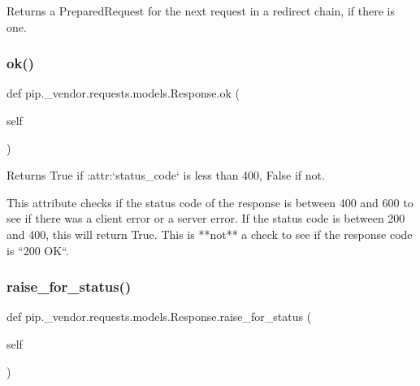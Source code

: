 \begin{DoxyVerb}Returns a PreparedRequest for the next request in a redirect chain, if there is one.\end{DoxyVerb}
 \mbox{\label{classpip_1_1__vendor_1_1requests_1_1models_1_1Response_a5e034889fee885f0e063b7b58d6a17d4}} 
\subsubsection{\texorpdfstring{ok()}{ok()}}
{\footnotesize\ttfamily def pip.\+\_\+vendor.\+requests.\+models.\+Response.\+ok (\begin{DoxyParamCaption}\item[{}]{self }\end{DoxyParamCaption})}

\begin{DoxyVerb}Returns True if :attr:`status_code` is less than 400, False if not.

This attribute checks if the status code of the response is between
400 and 600 to see if there was a client error or a server error. If
the status code is between 200 and 400, this will return True. This
is **not** a check to see if the response code is ``200 OK``.
\end{DoxyVerb}
 \mbox{\label{classpip_1_1__vendor_1_1requests_1_1models_1_1Response_a786847f30e14732dd7d4ac5dfacebac2}} 
\subsubsection{\texorpdfstring{raise\+\_\+for\+\_\+status()}{raise\_for\_status()}}
{\footnotesize\ttfamily def pip.\+\_\+vendor.\+requests.\+models.\+Response.\+raise\+\_\+for\+\_\+status (\begin{DoxyParamCaption}\item[{}]{self }\end{DoxyParamCaption})}

